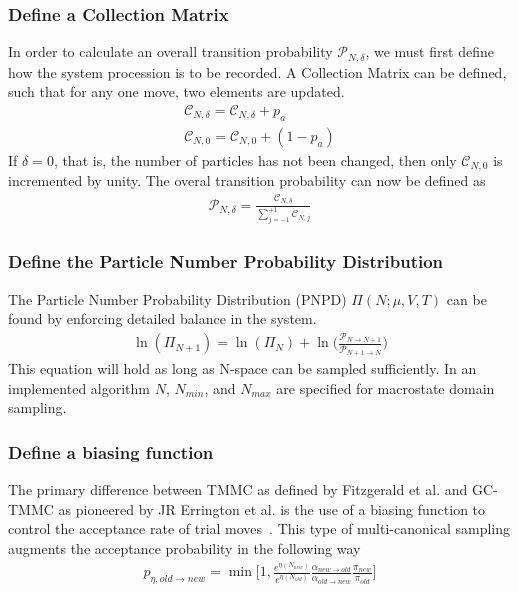 \documentclass[letterpaper,twocolumn,amsmath,amssymb,pre,aps,10pt]{revtex4-1}
\begin{document}
\subsubsection{Define a Collection Matrix}
In order to calculate an overall transition probability $\mathcal{P}_{N,\delta}$, we
must first define how the system procession is to be recorded.  A Collection Matrix
can be defined, such that for any one move, two elements are updated.
\begin{align}
  \mathcal{C}_{N,\delta} = \mathcal{C}_{N,\delta} + p_{a}\\
  \mathcal{C}_{N,0} = \mathcal{C}_{N,0} +(1 - p_{a})
\end{align}  
If $\delta=0$, that is, the number of particles has not been changed, then only 
$\mathcal{C}_{N,0}$ is incremented by unity.  The overal transition probability can
now be defined as 
\begin{align}
  \mathcal{P}_{N,\delta} = \frac{\mathcal{C}_{N,\delta}}
  {\sum_{j=-1}^{+1} \mathcal{C}_{N,j}}
\end{align} 

\subsubsection{Define the Particle Number Probability Distribution}
The Particle Number Probability Distribution (PNPD) $\Pi(N;\mu,V,T)$ can be found 
by enforcing detailed balance in the system.
\begin{align}
  \ln(\Pi_{N+1}) = \ln(\Pi_{N}) + \ln\bigg(\frac{\mathcal{P}_{N\rightarrow N+1}}
  {\mathcal{P}_{N+1\rightarrow N}}\bigg)
\end{align} 
This equation will hold as long as N-space can be sampled sufficiently.  In an 
implemented algorithm $N$, $N_{min}$, and $N_{max}$ are specified for macrostate domain
sampling.

\subsubsection{Define a biasing function}
The primary difference between TMMC as defined by Fitzgerald et al. and GC-TMMC as 
pioneered by JR Errington et al. is the use of a biasing function to control the acceptance
rate of trial moves~\cite{siderius2013use, fitzgerald2000monte}.  This type of 
multi-canonical sampling augments the acceptance probability in the following way 
\begin{align}
  p_{\eta,old\rightarrow new} = \min\bigg[1,\frac{e^{\eta(N_{new})}}
  {e^{\eta(N_{old})}}\frac{\alpha_{new\rightarrow old}}
  {\alpha_{old \rightarrow new}}\frac{\pi_{new}}{\pi_{old}}\bigg]
\end{align}
\end{document}
